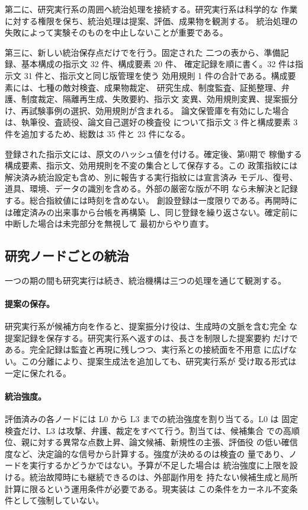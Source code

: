第二に、研究実行系の周囲へ統治処理を接続する。研究実行系は科学的な
作業に対する権限を保ち、統治処理は提案、評価、成果物を観測する。
統治処理の失敗によって実験そのものを中止しないことが重要である。

第三に、新しい統治保存点だけでを行う。固定された
二つの表から、準備記録、基本構成の指示文 32 件、構成要素 20 件、
確定記録を順に書く。32 件は指示文
31 件と、指示文と同じ版管理を使う
効用規則 1 件の合計である。構成要素には、七種の敵対検査、成果物裁定、
研究生成、制度監査、証拠整理、弁護、制度裁定、隔離再生成、失敗要約、指示文
変異、効用規則変異、提案振分け、再試験事例の選択、効用規則が含まれる。
論文保管庫を有効にした場合は、執筆役、査読役、論文自己選好の検査役
について指示文 3 件と構成要素 3 件を追加するため、総数は 35 件と
23 件になる。

登録された指示文には、原文のハッシュ値を付ける。確定後、第0期で
稼働する構成要素、指示文、効用規則を不変の集合として保存する。この
政策指紋には解決済み統治設定も含め、別に報告する実行指紋には宣言済み
モデル、復号、道具、環境、データの識別を含める。外部の厳密な版が不明
なら未解決と記録する。総合指紋値には時刻を含めない。
創設登録は一度限りである。再開時には確定済みの出来事から台帳を再構築
し、同じ登録を繰り返さない。確定前に中断した場合は未完部分を無視して
最初からやり直す。

\subsection{研究ノードごとの統治}\label{sec:rqgm:node}

一つの期の間も研究実行は続き、統治機構は三つの処理を通じて観測する。

\paragraph{提案の保存。}
研究実行系が候補方向を作ると、提案振分け役は、生成時の文脈を含む完全
な提案記録を保存する。研究実行系へ返すのは、長さを制限した提案要約
だけである。完全記録は監査と再現に残しつつ、実行系との接続面を不用意
に広げない。この分離により、提案生成法を追加しても、研究実行系が
受け取る形式は一定に保たれる。

\paragraph{統治強度。}
評価済みの各ノードには L0 から L3 までの統治強度を割り当てる。L0 は
固定検査だけ、L3 は攻撃、弁護、裁定をすべて行う。割当ては、候補集合
での高順位、親に対する異常な点数上昇、論文候補、新規性の主張、評価役
の低い確信度など、決定論的な信号から計算する。強度が決めるのは検査の
量であり、ノードを実行するかどうかではない。予算が不足した場合は
統治強度に上限を設ける。統治故障時にも継続できるのは、外部副作用を
持たない候補生成と局所計算に限るという運用条件が必要である。現実装は
この条件をカーネル不変条件として強制していない。

